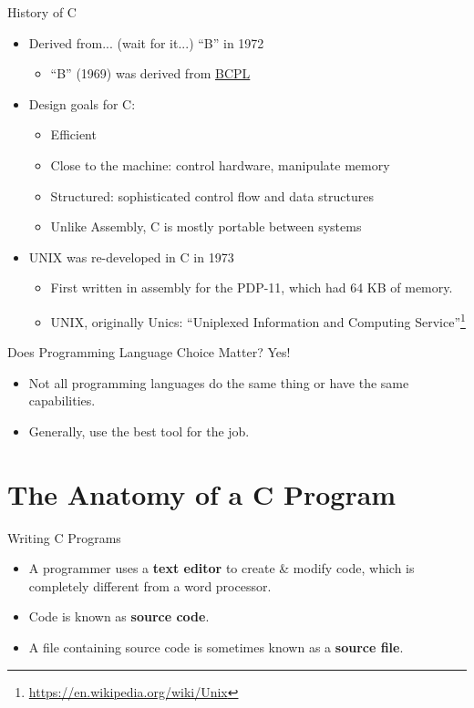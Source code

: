 \documentclass[graphics]{beamer}
\begin{document}
\begin{frame}{History of C}
    \begin{itemize}
        \item Derived from... (wait for it...) ``B'' in 1972
        \begin{itemize}
            \item ``B'' (1969) was derived from \href{https://en.wikipedia.org/wiki/BCPL}{BCPL}
        \end{itemize}
        \item Design goals for C:
        \begin{itemize}
            \item Efficient
            \item Close to the machine: control hardware, manipulate memory
            \item Structured: sophisticated control flow and data structures
            \item Unlike Assembly, C is mostly portable between systems
        \end{itemize}
        \item UNIX was re-developed in C in 1973
        \begin{itemize}
            \item First written in assembly for the PDP-11, which had 64 KB of memory.
            \item UNIX, originally Unics: ``Uniplexed Information and Computing Service''\footnote{\url{https://en.wikipedia.org/wiki/Unix}}
        \end{itemize}
    \end{itemize}
\end{frame}

\begin{frame}{Does Programming Language Choice Matter?}
    Yes!
    \begin{itemize}
        \item Not all programming languages do the same thing or have the same capabilities.
        \item Generally, use the best tool for the job.
    \end{itemize}
\end{frame}

\section{The Anatomy of a C Program}
\begin{frame}{Writing C Programs}
    \begin{itemize}
        \item A programmer uses a \textbf{text editor} to create \& modify code, which is completely different from a word processor.
        \item Code is known as \textbf{source code}.
        \item A file containing source code is sometimes known as a \textbf{source file}.
    \end{itemize}
\end{frame}
\end{document}
